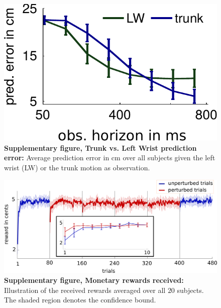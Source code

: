 \begin{figure}
\centering
\includegraphics[width=.4\textwidth]{Elmar/picsSupp/SubFigPredErrorTrunkvsLW}
 \caption{\textbf{Supplementary figure, Trunk vs. Left Wrist prediction error:} 
 Average prediction error in cm over all subjects given the left wrist (LW) or the trunk motion as observation. 
 }
\label{fig:SubFigPredErrorTrunkvsLW}
\end{figure}



\begin{figure}
\centering
\includegraphics[width=\textwidth]{Elmar/picsSupp/FigRewards}
 \caption{\textbf{Supplementary figure, Monetary rewards received: } 
 Illustration of the received rewards averaged over all $20$ subjects. The shaded region denotes the confidence bound. 
 }
\label{fig:SubFigRewards}
\end{figure}
